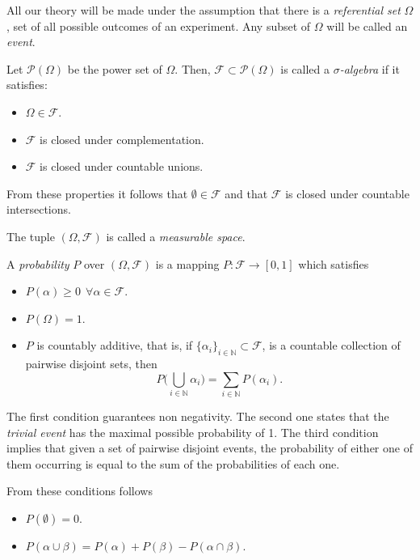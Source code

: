 
All our theory will be made under the assumption that there is a
\emph{referential set} \(\Omega\), set of all possible outcomes of an experiment. Any subset of
\(\Omega\) will be called an \emph{event}.

\begin{definition}
Let \(\mathcal{P}(\Omega)\) be the power set of \(\Omega\). Then, \(\mathcal{F} \subset \mathcal{P}(\Omega)\) is called a
\emph{\(\sigma\)-algebra} if it satisfies:
\begin{itemize}
\item \(\Omega \in \mathcal{F}\).
\item \(\mathcal{F}\) is closed under complementation.
\item \(\mathcal{F}\) is closed under countable unions.
\end{itemize}
From these properties it follows that \(\emptyset \in \mathcal{F}\) and that \(\mathcal{F}\)
is closed under countable intersections.

The tuple \((\Omega, \mathcal{F})\) is called a \emph{measurable space}.
\end{definition}

\begin{definition}
A \emph{probability} \(P\) over \((\Omega, \mathcal{F})\) is a mapping
\(P: \mathcal{F} \to [0,1]\) which satisfies
\begin{itemize}
\item \(P(\alpha) \geq 0 \ \ \forall \alpha \in \mathcal{F}\).
\item \(P(\Omega) = 1\).
\item \(P\) is countably additive, that is, if \(\{\alpha_i\}_{i \in \mathbb{N}}
  \subset \mathcal{F}\), is a countable collection of pairwise disjoint sets,
  then
  \[
  P\big(\bigcup_{i\in \mathbb{N}}\alpha_i\big) = \sum_{i\in \mathbb{N}}P(\alpha_i).
  \]
\end{itemize}
\end{definition}

The first condition guarantees non negativity. The second one states that the
\emph{trivial event} has the maximal possible probability of 1.
The third condition implies that given a set of pairwise disjoint events,
the probability of either one of them occurring is equal to the sum of the
probabilities of each one.

From these conditions follows
\begin{itemize}
\item \(P(\emptyset) = 0\).
\item \(P(\alpha \cup \beta) = P(\alpha) + P(\beta) - P(\alpha \cap \beta)\).
\end{itemize}

